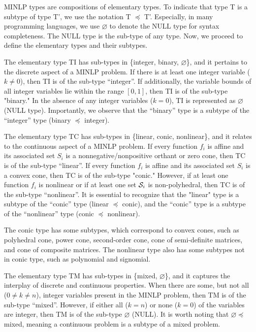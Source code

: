 MINLP types are compositions of elementary types. To indicate that type T is a subtype of type T', we use the notation T $\preceq $ T'. Especially, in many programming languages, we use $\varnothing$ to denote the NULL type for syntax completeness. The NULL type is the sub-type of any type. Now, we proceed to define the elementary types and  their subtypes.



The elementary type TI  has sub-types in \{integer, binary, $\varnothing$\}, and it pertains to the discrete aspect of a MINLP problem. If there is at least one integer variable ($k\ne 0$), then TI is of the sub-type ``integer''. If additionally, the variable bounds of all integer variables lie within the range $[0, 1]$, then TI is of the sub-type  "binary." In the absence of any integer variables ($k=0$), TI is represented as $\varnothing$ (NULL type). Importantly, we observe that the ``binary'' type is a subtype of the ``integer'' type (binary $\preceq $ integer).

The elementary type TC has sub-types in \{linear, conic, nonlinear\}, and it relates to the continuous aspect of a MINLP problem. If every function $f_i$ is affine and its associated set $S_i$ is a nonnegative/nonpositive orthant or zero cone, then TC is of the sub-type ``linear''. If every function $f_i$ is affine and its associated set $S_i$ is a convex cone, then TC is of the sub-type "conic." However, if at least one function $f_i$ is nonlinear or if at least one set $\mathcal S_i$ is non-polyhedral, then TC is of the sub-type ``nonlinear''. It is essential to recognize that the "linear" type is a subtype of the ``conic'' type (linear $\preceq $ conic), and the ``conic'' type is a subtype of the ``nonlinear'' type (conic $\preceq $ nonlinear).


The conic type has some subtypes, which correspond to convex cones, such as polyhedral cone, power cone, second-order cone, cone of semi-definite matrices, and cone of composite matrices. The nonlinear type also has some subtypes not in conic type, such as polynomial and signomial.


The elementary type TM  has sub-types  in \{mixed, $\varnothing$\}, and it captures the interplay of discrete and continuous properties. When there are some, but not all ($0 \ne k \ne n$), integer variables present in the MINLP problem, then TM is of the sub-type ``mixed''. However, if either all ($k = n$) or none ($k = 0$) of the variables are integer, then TM is of the sub-type $\varnothing$ (NULL). It is worth noting that $\varnothing \preceq$  mixed, meaning a continuous problem is a subtype of a mixed problem.

